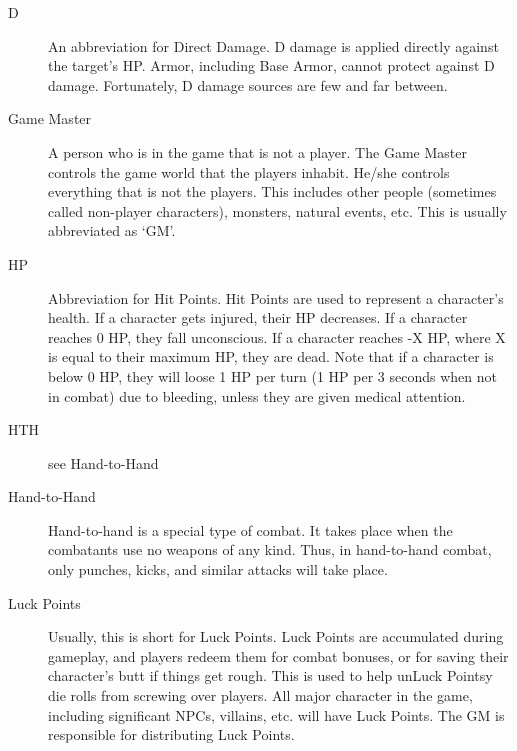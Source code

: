 \documentclass[twoside]{book}
\begin{document}
\begin{description}
  \item[ D ]   An abbreviation for Direct Damage. D damage is
                 applied directly against the target's HP. Armor,
                 including Base Armor, cannot protect against D damage.
                 Fortunately, D damage sources are few and far between.
                 
  \item[ Game Master ]   A person who is in the game that is not a player.
                 The Game Master controls the game world that the players
                 inhabit. He/she controls everything that is not the
                 players. This includes other people (sometimes called
                 non-player characters), monsters, natural events, etc.
                 This is usually abbreviated as `GM'. 
  \item[ HP ]   Abbreviation for Hit Points. Hit Points are used
                 to represent a character's health. If a character
                 gets injured, their HP decreases. If a character reaches
                 0 HP, they fall unconscious. If a character reaches -X
                 HP, where X is equal to their maximum HP, they are dead.
                 Note that if a character is below 0 HP, they will loose
                 1 HP per turn (1 HP per 3 seconds when not in combat)
                 due to bleeding, unless they are given medical
                 attention. 
  \item[ HTH ]   see Hand-to-Hand 
  \item[ Hand-to-Hand ]   Hand-to-hand is a special type of combat. It
                 takes place when the combatants use no weapons of any
                 kind. Thus, in hand-to-hand combat, only punches, kicks,
                 and similar attacks will take place. 
  \item[ Luck Points ]   Usually, this is short for Luck Points. Luck
                 Points are accumulated during gameplay, and players
                 redeem them for combat bonuses, or for saving their
                 character's butt if things get rough. This is used
                 to help unLuck Pointsy die rolls from screwing over
                 players. All major character in the game, including
                 significant NPCs, villains, etc. will have Luck Points.
                 The GM is responsible for distributing Luck Points.
                 

\end{description}
\end{document}
